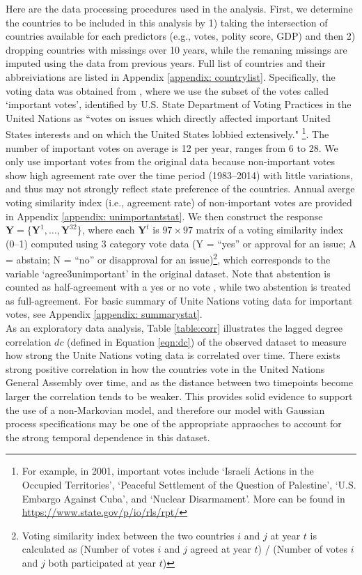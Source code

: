 \documentclass[a4paper]{article}
\begin{document}
Here are the data processing procedures used in the analysis. First, we determine the countries to be included in this analysis by 1) taking the intersection of countries available for each predictors (e.g., votes, polity score, GDP) and then 2) dropping countries with missings over 10 years, while the remaning missings are imputed using the data from previous years. Full list of countries and their abbreiviations are listed in Appendix \ref{appendix: countrylist}. Specifically, the voting data was obtained from \cite{12379_2016}, where we use the subset of the votes called `important votes', identified by U.S. State Department of Voting Practices in the United Nations as ``votes on issues which directly affected important United States interests and on which the United States lobbied extensively." \footnote{For example, in 2001, important votes include `Israeli Actions in the Occupied Territories', `Peaceful Settlement of the Question of Palestine', `U.S. Embargo Against Cuba', and `Nuclear Disarmament'. More can be found in \url{https://www.state.gov/p/io/rls/rpt/}}. The number of important votes on average is 12 per year, ranges from 6 to 28. We only use important votes from the original data because non-important votes show high agreement rate over the time period (1983--2014) with little variations, and thus may not strongly reflect state preference of the countries. Annual averge voting similarity index (i.e., agreement rate) of non-important votes are provided in Appendix \ref{appendix: unimportantstat}. We then construct the response $\mathbf{Y} = \{\mathbf{Y} ^1,\ldots,\mathbf{Y} ^{32}\}$, where each $\mathbf{Y} ^t$ is $97\times 97$ matrix of a voting similarity index (0--1) computed using 3 category vote data (Y = “yes” or approval for an issue; A = abstain; N = “no” or disapproval for an issue)\footnote{Voting similarity index between the two countries $i$ and $j$ at year $t$ is calculated as (Number of votes $i$ and $j$ agreed at year $t$) / (Number of votes $i$ and $j$ both participated at year $t$)}, which corresponds to the variable `agree3unimportant' in the original dataset. Note that abstention is counted as half-agreement with a yes or no vote \citep*{12379_2016}, while two abstention is treated as full-agreement. For basic summary of Unite Nations voting data for important votes, see Appendix \ref{appendix: summarystat}. \\ \newline
As an exploratory data analysis, Table \ref{table:corr} illustrates the lagged degree correlation $dc$ (defined in Equation \ref{eqn:dc}) of the observed dataset to measure how strong the Unite Nations voting data is correlated over time. There exists strong positive correlation in how the countries vote in the United Nations General Assembly over time, and as the distance between two timepoints become larger the correlation tends to be weaker. This provides solid evidence to support the use of a non-Markovian model, and therefore our model with Gaussian process specifications may be one of the appropriate appraoches to account for the strong temporal dependence in this dataset.\\
\end{document}

